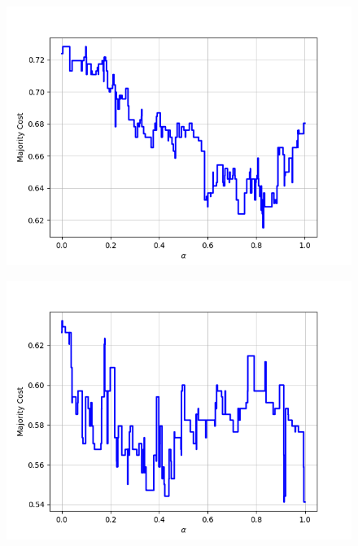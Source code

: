 \begin{figure}[h]
\begin{minipage}{.19\textwidth}
  {\includegraphics[width=\linewidth]{plots/omniglot-intra-ac-cnn/Sanskrit}}
\end{minipage}
\begin{minipage}{.19\textwidth}
  \centering
  {\includegraphics[width=\linewidth]{plots/omniglot-intra-ac-cnn/Syriac_(Estrangelo)}}
\end{minipage}
\begin{minipage}{.19\textwidth}
  \centering

\end{minipage}
\end{figure}
